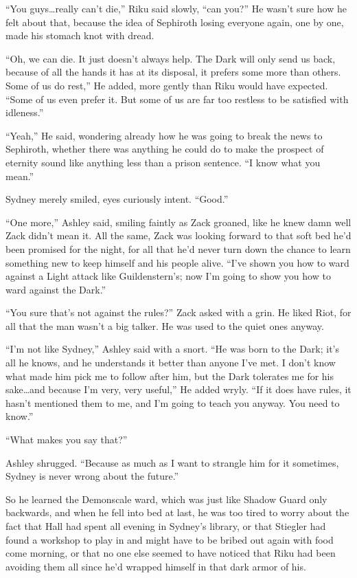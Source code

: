 ``You guys\ldots really can't die,'' Riku said slowly, ``can you?'' He wasn't sure how he felt about that, because the idea of Sephiroth losing everyone again, one by one, made his stomach knot with dread.

``Oh, we can die. It just doesn't always help. The Dark will only send us back, because of all the hands it has at its disposal, it prefers some more than others. Some of us do rest,'' He added, more gently than Riku would have expected. ``Some of us even prefer it. But some of us are far too restless to be satisfied with idleness.''

``Yeah,'' He said, wondering already how he was going to break the news to Sephiroth, whether there was anything he could do to make the prospect of eternity sound like anything less than a prison sentence. ``I know what you mean.''

Sydney merely smiled, eyes curiously intent. ``Good.''


\scenechange


``One more,'' Ashley said, smiling faintly as Zack groaned, like he knew damn well Zack didn't mean it. All the same, Zack was looking forward to that soft bed he'd been promised for the night, for all that he'd never turn down the chance to learn something new to keep himself and his people alive. ``I've shown you how to ward against a Light attack like Guildenstern's; now I'm going to show you how to ward against the Dark.''

``You sure that's not against the rules?'' Zack asked with a grin. He liked Riot, for all that the man wasn't a big talker. He was used to the quiet ones anyway.

``I'm not like Sydney,'' Ashley said with a snort. ``He was born to the Dark; it's all he knows, and he understands it better than anyone I've met. I don't know what made him pick me to follow after him, but the Dark tolerates me for his sake\ldots and because I'm very, very useful,'' He added wryly. ``If it does have rules, it hasn't mentioned them to me, and I'm going to teach you anyway. You need to know.''

``What makes you say that?''

Ashley shrugged. ``Because as much as I want to strangle him for it sometimes, Sydney is never wrong about the future.''

So he learned the Demonscale ward, which was just like Shadow Guard only backwards, and when he fell into bed at last, he was too tired to worry about the fact that Hall had spent all evening in Sydney's library, or that Stiegler had found a workshop to play in and might have to be bribed out again with food come morning, or that no one else seemed to have noticed that Riku had been avoiding them all since he'd wrapped himself in that dark armor of his.

